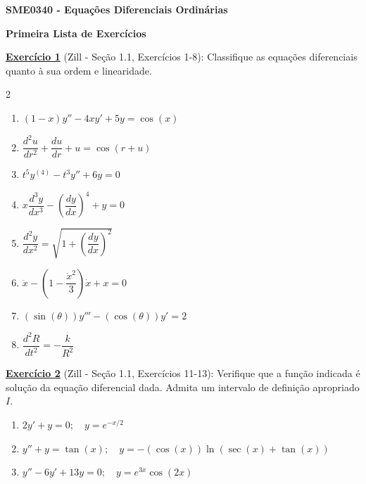 \documentclass[oneside,12pt,a4paper]{report}
\begin{document}
    \begin{center}
        \fontsize{17.28}{17.28}
            \textbf{SME0340 - Equações Diferenciais Ordinárias}

            \textbf{Primeira Lista de Exercícios}
    \end{center}

    \vspace{1.5cm}

    \noindent\textbf{\hyperlink{resp:ex1}{\hypertarget{quest:ex1}{Exercício 1}}} (Zill - Seção 1.1, Exercícios 1-8): Classifique as equações diferenciais quanto à sua ordem e linearidade.
    \begin{multicols}{2}
        \begin{enumerate}[label=\alph*)]
            \item $(1-x)y''-4xy'+5y=\cos(x)$
            \item $\dfrac{d^2u}{dr^2}+\dfrac{du}{dr}+u=\cos(r+u)$
            \item $t^5y^{(4)} - t^3y'' + 6y = 0$
            \item $x\dfrac{d^3y}{dx^3} - \left(\dfrac{dy}{dx}\right)^4 + y = 0$
            \item $\dfrac{d^2y}{dx^2} = \sqrt{1 + \left(\dfrac{dy}{dx}\right)^2}$
            \item $\ddot{x} - \left(1 - \dfrac{\dot{x}^2}{3}\right)\dot{x} + x = 0$
            \item $(\sin(\theta))y''' - (\cos(\theta))y' = 2$
            \item $\dfrac{d^2R}{dt^2} = -\dfrac{k}{R^2}$
        \end{enumerate}
    \end{multicols}
    \vspace{0.5cm}

    \noindent\textbf{\hyperlink{resp:ex2}{\hypertarget{quest:ex2}{Exercício 2}}} (Zill - Seção 1.1, Exercícios 11-13): Verifique que a função indicada é solução da equação diferencial dada. Admita um intervalo de definição apropriado $I$.
    \begin{enumerate}[label=\alph*)]
        \item $2y' + y = 0; \quad y = e^{-x/2}$
        \item $y'' + y = \tan(x); \quad y = -(\cos(x)) \ln(\sec(x) + \tan(x))$
        \item $y'' - 6y' + 13y = 0; \quad y = e^{3x} \cos(2x)$
    \end{enumerate}
    \vspace{0.5cm}
\end{document}
